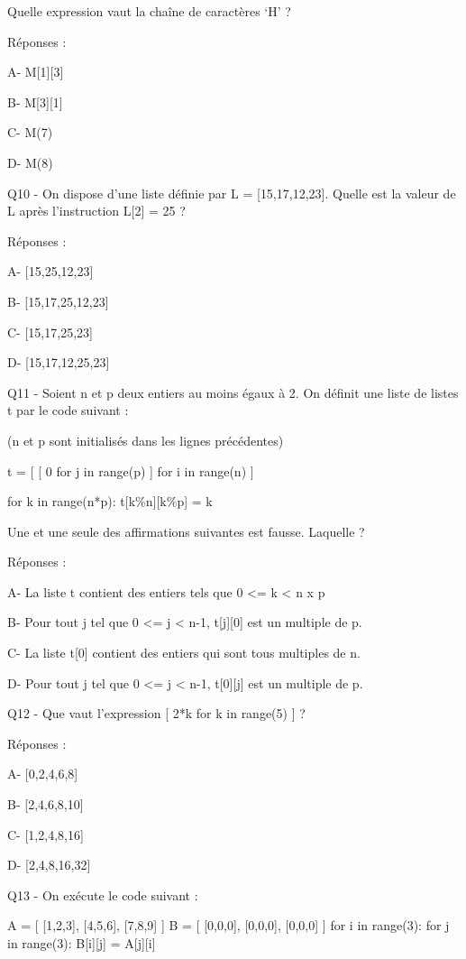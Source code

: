 \documentclass[
]{book}
\begin{document}
Quelle expression vaut la chaîne de caractères `H' ?

Réponses :

A- M{[}1{]}{[}3{]}

B- M{[}3{]}{[}1{]}

C- M(7)

D- M(8)

Q10 - On dispose d'une liste définie par L = {[}15,17,12,23{]}. Quelle est la valeur de L après l'instruction L{[}2{]} = 25 ?

Réponses :

A- {[}15,25,12,23{]}

B- {[}15,17,25,12,23{]}

C- {[}15,17,25,23{]}

D- {[}15,17,12,25,23{]}

Q11 - Soient n et p deux entiers au moins égaux à 2. On définit une liste de listes t par le code suivant :

(n et p sont initialisés dans les lignes précédentes)

t = {[} {[} 0 for j in range(p) {]} for i in range(n) {]}

for k in range(n*p):
t{[}k\%n{]}{[}k\%p{]} = k

Une et une seule des affirmations suivantes est fausse. Laquelle ?

Réponses :

A- La liste t contient des entiers tels que 0 \textless= k \textless{} n x p

B- Pour tout j tel que 0 \textless= j \textless{} n-1, t{[}j{]}{[}0{]} est un multiple de p.

C- La liste t{[}0{]} contient des entiers qui sont tous multiples de n.

D- Pour tout j tel que 0 \textless= j \textless{} n-1, t{[}0{]}{[}j{]} est un multiple de p.

Q12 - Que vaut l'expression {[} 2*k for k in range(5) {]} ?

Réponses :

A- {[}0,2,4,6,8{]}

B- {[}2,4,6,8,10{]}

C- {[}1,2,4,8,16{]}

D- {[}2,4,8,16,32{]}

Q13 - On exécute le code suivant :

A = {[} {[}1,2,3{]}, {[}4,5,6{]}, {[}7,8,9{]} {]}
B = {[} {[}0,0,0{]}, {[}0,0,0{]}, {[}0,0,0{]} {]}
for i in range(3):
for j in range(3):
B{[}i{]}{[}j{]} = A{[}j{]}{[}i{]}
\end{document}
